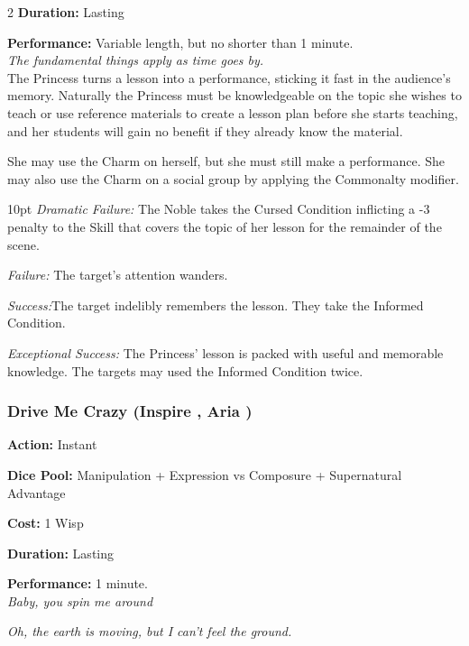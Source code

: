 \begin{multicols}{2}
\noindent \textbf{Duration:} Lasting

\noindent \textbf{Performance:} Variable length, but no shorter than 1 minute. \\ 

\textit{The fundamental things apply as time goes by.} \\

\noindent The Princess turns a lesson into a performance, sticking it fast in the audience's memory. Naturally the Princess must be knowledgeable on the topic she wishes to teach or use reference materials to create a lesson plan before she starts teaching, and her students will gain no benefit if they already know the material.

She may use the Charm on herself, but she must still make a performance. She may also use the Charm on a social group by applying the Commonalty modifier. 

\begin{myindentpar}{10pt}    \emph{Dramatic Failure:} The Noble takes the Cursed Condition inflicting a -3 penalty to the Skill that covers the topic of her lesson for the remainder of the scene.

    \emph{Failure:} The target’s attention wanders.

    \emph{Success:}The target indelibly remembers the lesson. They take the Informed Condition. 

    \emph{Exceptional Success:} The Princess' lesson is packed with useful and memorable knowledge. The targets may used the Informed Condition twice. 

\end{myindentpar}

\subsubsection*{Drive Me Crazy (Inspire \textbullet\textbullet, Aria \textbullet)}

\noindent \textbf{Action:} Instant 

\noindent \textbf{Dice Pool:} Manipulation + Expression vs Composure + Supernatural Advantage

\noindent \textbf{Cost:} 1 Wisp

\noindent \textbf{Duration:} Lasting

\noindent \textbf{Performance:} 1 minute. \\ 

\textit{Baby, you spin me around}

\textit{Oh, the earth is moving, but I can't feel the ground.} \\


\end{multicols}
